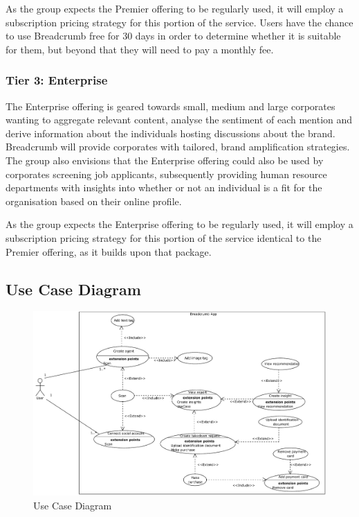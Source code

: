As the group expects the Premier offering to be regularly used, it will employ a subscription pricing strategy for this portion of the service. Users have the chance to use Breadcrumb free for 30 days in order to determine whether it is suitable for them, but beyond that they will need to pay a monthly fee.

\subsubsection{Tier 3: Enterprise}

The Enterprise offering is geared towards small, medium and large corporates wanting to aggregate relevant content, analyse the sentiment of each mention and derive information about the individuals hosting discussions about the brand. Breadcrumb will provide corporates with tailored, brand amplification strategies. The group also envisions that the Enterprise offering could also be used by corporates screening job applicants, subsequently providing human resource departments with insights into whether or not an individual is a fit for the organisation based on their online profile. 

As the group expects the Enterprise offering to be regularly used, it will employ a subscription pricing strategy for this portion of the service identical to the Premier offering, as it builds upon that package.

\subsection{Use Case Diagram}

\begin{figure}
  \centering
  \begin{minipage}{14cm}
    \centering
    \includegraphics[width=14cm]{inc/use_case_diagram.pdf}
    \caption{Use Case Diagram}
    \label{fig:useCaseDiagram}
  \end{minipage}
\end{figure}

